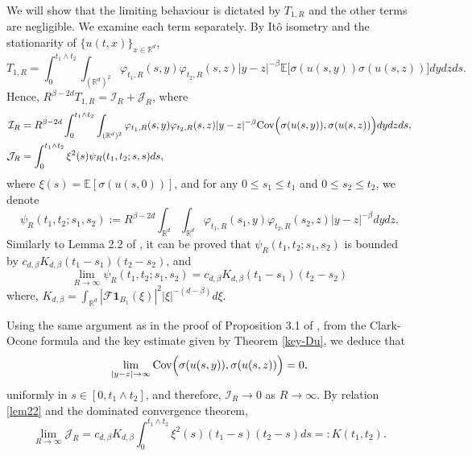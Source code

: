\documentclass[12pt]{article}
\def\cF{\mathcal{F}}
\def\cI{\mathcal{I}}
\def\cJ{\mathcal{J}}
\def\bE{\mathbb{E}}
\def\bR{\mathbb{R}}
\begin{document}
We will show that the limiting behaviour is dictated by $T_{1,R}$ and the other terms are negligible.
We examine each term separately. By It\^o isometry and the stationarity of $\{u(t,x)\}_{x\in \bR^d}$,
\[
T_{1,R}= \int_0^{t_1 \wedge t_2} \int_{(\bR^d)^2} \varphi_{t_1,R}(s,y) \varphi_{t_2,R} (s,z) |y-z|^{-\beta}\bE\big[\sigma(u(s,y)) \sigma(u(s,z))\big] dydz ds.
\]
Hence, $R^{\beta-2d} T_{1,R}=\cI_R+\cJ_R$, where
\begin{align*}
\cI_{R} &=R^{\beta-2d}\int_0^{t_1 \wedge t_2} \int_{(\bR^d)^2} \varphi_{t_1,R}(s,y) \varphi_{t_2,R} (s,z) |y-z|^{-\beta}{\rm Cov}\Big(\sigma(u(s,y)), \sigma(u(s,z))\Big) dydz ds, \\
\cJ_R &=\int_0^{t_1\wedge t_2}\xi^2(s) \psi_{R}(t_1,t_2;s,s) ds,
\end{align*}
where $\xi(s) = \bE[\sigma(u(s,0))]$, and for any $0\leq s_1 \leq t_1$ and $0\leq s_2 \leq t_2$, we denote
\[
\psi_R(t_1,t_2;s_1,s_2):=R^{\beta-2d} \int_{\bR^d} \int_{\bR^d} \varphi_{t_1,R}(s_1,y) \varphi_{t_2,R}(s_2,z)|y-z|^{-\beta}dydz.
\]
Similarly to Lemma 2.2 of \cite{BNZ}, it can be proved that
$\psi_R(t_1,t_2;s_1,s_2)$ is bounded by $c_{d,\beta}K_{d,\beta} (t_1-s_1)(t_2-s_2)$, and
\begin{equation}
\label{lem22}
\lim_{R \to \infty}\psi_R(t_1,t_2;s_1,s_2) =c_{d,\beta}K_{d,\beta} (t_1-s_1)(t_2-s_2)
\end{equation}
where, $K_{d,\beta}=\int_{\bR^d}|\cF \mathbf 1_{B_1}(\xi)|^2 |\xi|^{-(d-\beta)} d\xi$.

Using the same argument as in the proof of Proposition 3.1 of \cite{BNZ}, from the Clark-Ocone formula and the key estimate given by Theorem \ref{key-Du}, we deduce that
\[
\lim_{|y-z| \to \infty}{\rm Cov}\Big(\sigma(u(s,y)), \sigma(u(s,z))\Big) =0, 
\]
uniformly in $s\in [0,t_1 \wedge t_2]$, and therefore, $\cI_R \to 0$ as $R \to \infty$. 
By relation \eqref{lem22} and the dominated convergence theorem, 
\[
\lim_{R \to \infty}\cJ_R=c_{d,\beta} K_{d,\beta}\int_0^{t_1\wedge t_2}\xi^2(s) (t_1-s)(t_2-s)  ds=:K(t_1,t_2).
\]
\end{document}
